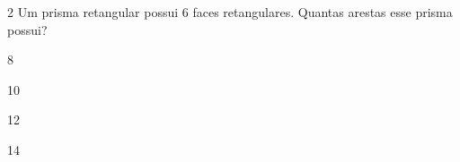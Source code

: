 
\num{2} Um prisma retangular possui 6 faces retangulares. Quantas arestas
esse prisma possui?


\begin{escolha}[itemsep=0pt]
\item 8
\item 10
\item 12
\item 14
\end{escolha}



